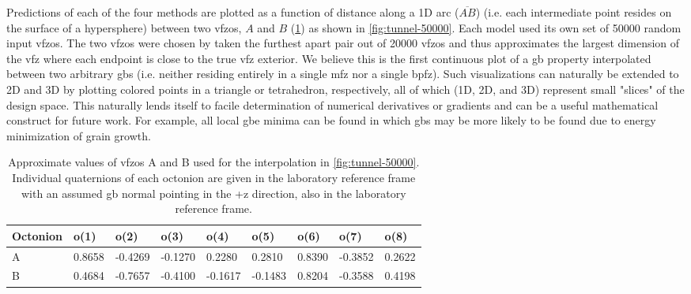 \documentclass[final,twocolumn,12pt]{elsarticle}
\newcommand{\inpt}{input}
\begin{document}
Predictions of each of the four methods are plotted as a function of distance along a 1D arc ($\overline{AB}$) (i.e. each intermediate point resides on the surface of a hypersphere) between two \glspl{vfzo}, $A$ and $B$ (\cref{tab:tunnel-AB}) as shown in  \cref{fig:tunnel-50000}. Each model used its own set of \num{50000} random \inpt{} \glspl{vfzo}. The two \glspl{vfzo} were chosen by taken the furthest apart pair out of \num{20000} \glspl{vfzo} and thus approximates the largest dimension of the \gls{vfz} where each endpoint is close to the true \gls{vfz} exterior. We believe this is the first continuous plot of a \gls{gb} property interpolated between two arbitrary \glspl{gb} (i.e. neither residing entirely in a single \gls{mfz} nor a single \gls{bpfz}). Such visualizations can naturally be extended to 2D and 3D by plotting colored points in a triangle or tetrahedron, respectively, all of which (1D, 2D, and 3D) represent small "slices" of the design space. This naturally lends itself to facile determination of numerical derivatives or gradients and can be a useful mathematical construct for future work. For example, all local \gls{gbe} minima can be found in which \glspl{gb} may be more likely to be found due to energy minimization of grain growth.

\begin{table}[]
\centering
\caption{Approximate values of \glspl{vfzo} A and B used for the interpolation in \cref{fig:tunnel-50000}. Individual quaternions of each octonion are given in the laboratory reference frame with an assumed \gls{gb} normal pointing in the +z direction, also in the laboratory reference frame.}
\label{tab:tunnel-AB}
\begin{tabular}{@{}lllllllll@{}}
\toprule
Octonion & o(1)   & o(2)    & o(3)    & o(4)    & o(5)    & o(6)   & o(7)    & o(8)   \\ \midrule
A        & 0.8658 & -0.4269 & -0.1270 & 0.2280  & 0.2810  & 0.8390 & -0.3852 & 0.2622 \\
B        & 0.4684 & -0.7657 & -0.4100 & -0.1617 & -0.1483 & 0.8204 & -0.3588 & 0.4198 \\ \bottomrule
\end{tabular}
\end{table}
    
\end{document}
